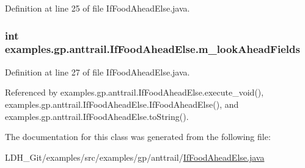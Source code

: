 Definition at line 25 of file If\-Food\-Ahead\-Else.\-java.

\hypertarget{classexamples_1_1gp_1_1anttrail_1_1_if_food_ahead_else_a53d378f85489cf7db4b876833398b38f}{
\subsubsection[{m\-\_\-look\-Ahead\-Fields}]{\setlength{\rightskip}{0pt plus 5cm}int examples.\-gp.\-anttrail.\-If\-Food\-Ahead\-Else.\-m\-\_\-look\-Ahead\-Fields\hspace{0.3cm}{\ttfamily [private]}}}\label{classexamples_1_1gp_1_1anttrail_1_1_if_food_ahead_else_a53d378f85489cf7db4b876833398b38f}


Definition at line 27 of file If\-Food\-Ahead\-Else.\-java.



Referenced by examples.\-gp.\-anttrail.\-If\-Food\-Ahead\-Else.\-execute\-\_\-void(), examples.\-gp.\-anttrail.\-If\-Food\-Ahead\-Else.\-If\-Food\-Ahead\-Else(), and examples.\-gp.\-anttrail.\-If\-Food\-Ahead\-Else.\-to\-String().



The documentation for this class was generated from the following file\-:\begin{DoxyCompactItemize}
\item 
L\-D\-H\-\_\-\-Git/examples/src/examples/gp/anttrail/\hyperlink{_if_food_ahead_else_8java}{If\-Food\-Ahead\-Else.\-java}\end{DoxyCompactItemize}
